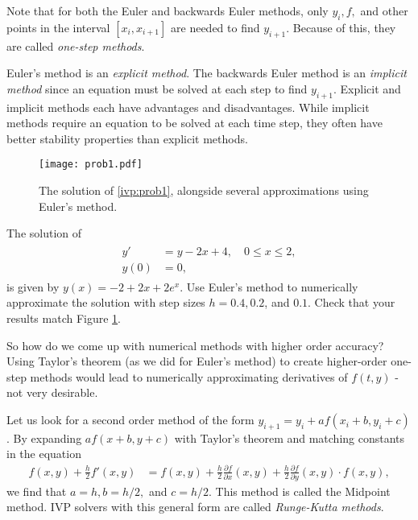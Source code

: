 Note that for both the Euler and backwards Euler methods, only $y_i, f,$ and other points in the interval $[x_i, x_{i+1}]$ are needed to find $y_{i+1}$. 
Because of this, they are called \textit{one-step methods}.

Euler's method is an \textit{explicit method}. 
The backwards Euler method is an \textit{implicit method} since an equation must be solved at each step to find $y_{i+1}$. 
Explicit and implicit methods each have advantages and disadvantages. 
While implicit methods require an equation to be solved at each time step, they often have better stability properties than explicit methods.

\begin{figure}[ht]
\centering
\texttt{[image: prob1.pdf]}
\caption{The solution of \eqref{ivp:prob1}, alongside several approximations using Euler's method.}
\label{ivp:euler}
\end{figure}


\begin{problem} The solution of
\begin{align}
	\begin{split}
		y' &= y - 2x + 4,\quad 0 \leq x \leq 2, \\
		y(0) &= 0,
	\end{split}\label{ivp:prob1}
\end{align}
is given by $y(x) = -2+2x + 2e^x.$
Use Euler's method to numerically approximate the solution with step sizes $h = 0.4, 0.2$, and $0.1.$ 
Check that your results match Figure \ref{ivp:euler}.
\end{problem}

So how do we come up with numerical methods with higher order accuracy? 
Using Taylor's theorem (as we did for Euler's method) to create higher-order one-step methods would lead to numerically approximating derivatives of $f(t,y)$ - not very desirable.

Let us look for a second order method of the form $y_{i+1} = y_i + a f(x_i+b, y_i+c)$. 
By expanding $a f(x+b, y+c)$ with Taylor's theorem and matching constants in the equation
\begin{align*}
f(x,y) + \frac{h}{2}f'(x,y) &= f(x,y) + \frac{h}{2}\frac{\partial f}{\partial x}(x,y) + \frac{h}{2}\frac{\partial f}{\partial y}(x,y) \cdot f(x,y),
\end{align*}
we find that $a = h, b = h/2,$ and $c = h/2$. 
This method is called the Midpoint method. 
IVP solvers with this general form are called \textit{Runge-Kutta methods}. 

